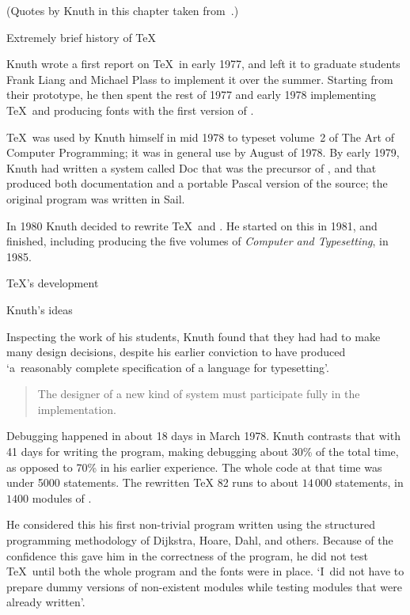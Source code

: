 (Quotes by Knuth in this chapter taken from~\cite{Knuth:TeXerrors}.)

 {Extremely brief history of \TeX}

Knuth wrote a first report on \TeX\ in early 1977, and left it to
graduate students Frank Liang and Michael Plass to implement it over
the summer. Starting from their prototype,
he then spent the rest of 1977 and early 1978 implementing \TeX\ and
producing fonts with the first version of \metafont. 

\TeX\ was used by Knuth himself in mid 1978 to typeset volume~2 of The
Art of Computer Programming; it was in general
use by August of 1978. By early 1979, Knuth had written a system
called Doc that was the precursor of \web, and that produced both
documentation and a portable Pascal version of the source; the
original program was written in Sail.

In 1980 Knuth decided to rewrite \TeX\ and \metafont. He started on
this in 1981, and finished, including producing the five volumes of
\textsl{Computer and Typesetting}, in 1985.

 {\TeX's development}

 {Knuth's ideas}

Inspecting the work of his students, Knuth found that they had had to
make many design decisions, despite his earlier conviction to have
produced `a~reasonably complete specification of a language for
typesetting'.
\begin{quote}
The designer of a new kind of system must participate fully in the
implementation.
\end{quote}

Debugging happened in about 18 days in March 1978. Knuth contrasts
that with 41 days for writing the program, making debugging about 30\%
of the total time, as opposed to 70\% in his earlier experience. The
whole code at that time was under 5000 statements. The rewritten \TeX
82 runs to about $14\,000$ statements, in $1400$ modules of \web.

He considered
this his first non-trivial program written using the structured programming methodology of Dijkstra, Hoare,
Dahl, and others. Because of the confidence this gave him in the
correctness of the program, he did not test \TeX\ until both the whole
program and the fonts were in place. `I~did not have to prepare dummy
versions of non-existent modules while testing modules that were
already written'.

